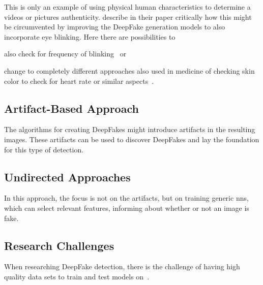 \par
This is only an example of using physical human characteristics to determine a
videos or pictures authenticity. \textcite{li_ictu_2018} describe in 
their paper critically how this might be circumvented by improving the DeepFake
generation models to also incorporate eye blinking. Here there are possibilities
to 
\begin{enumerate*}[a.)]
    \item also check for frequency of blinking~\cite{li_ictu_2018} or
    \item change to completely different approaches also used in medicine of
    checking skin color to check for heart rate or similar aspects~\cite{pishori_detecting_2020}.
\end{enumerate*}

\subsection{Artifact-Based Approach}
The algorithms for creating DeepFakes might introduce artifacts in the resulting
images. These artifacts can be used to discover DeepFakes and lay the foundation
for this type of detection.

\subsection{Undirected Approaches}
In this approach, the focus is not on the artifacts, but on training generic
\glspl{nn}, which can select relevant features, informing about whether or not
an image is fake. 

\subsection{Research Challenges}
When researching DeepFake detection, there is the challenge of having high
quality data sets to train and test models on~\cite{li_celeb-df_2019}.
